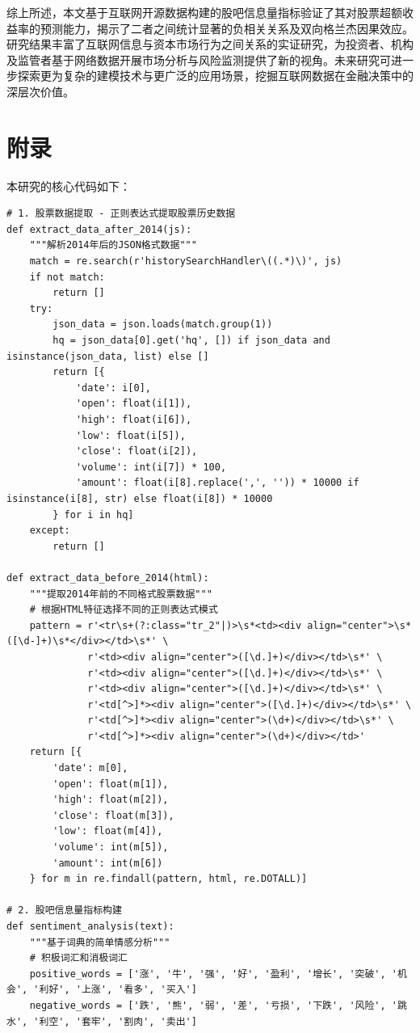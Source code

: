 \documentclass[12pt, a4paper]{article}
\begin{document}
综上所述，本文基于互联网开源数据构建的股吧信息量指标验证了其对股票超额收益率的预测能力，揭示了二者之间统计显著的负相关关系及双向格兰杰因果效应。研究结果丰富了互联网信息与资本市场行为之间关系的实证研究，为投资者、机构及监管者基于网络数据开展市场分析与风险监测提供了新的视角。未来研究可进一步探索更为复杂的建模技术与更广泛的应用场景，挖掘互联网数据在金融决策中的深层次价值。

\printbibliography[title=参考文献]

\section{附录}

本研究的核心代码如下：

\begin{lstlisting}[basicstyle=\small\ttfamily, breaklines=true, columns=fullflexible]
# 1. 股票数据提取 - 正则表达式提取股票历史数据
def extract_data_after_2014(js):
    """解析2014年后的JSON格式数据"""
    match = re.search(r'historySearchHandler\((.*)\)', js)
    if not match:
        return []
    try:
        json_data = json.loads(match.group(1))
        hq = json_data[0].get('hq', []) if json_data and isinstance(json_data, list) else []
        return [{
            'date': i[0],
            'open': float(i[1]),
            'high': float(i[6]),
            'low': float(i[5]),
            'close': float(i[2]),
            'volume': int(i[7]) * 100,
            'amount': float(i[8].replace(',', '')) * 10000 if isinstance(i[8], str) else float(i[8]) * 10000
        } for i in hq]
    except:
        return []

def extract_data_before_2014(html):
    """提取2014年前的不同格式股票数据"""
    # 根据HTML特征选择不同的正则表达式模式
    pattern = r'<tr\s+(?:class="tr_2"|)>\s*<td><div align="center">\s*([\d-]+)\s*</div></td>\s*' \
              r'<td><div align="center">([\d.]+)</div></td>\s*' \
              r'<td><div align="center">([\d.]+)</div></td>\s*' \
              r'<td><div align="center">([\d.]+)</div></td>\s*' \
              r'<td[^>]*><div align="center">([\d.]+)</div></td>\s*' \
              r'<td[^>]*><div align="center">(\d+)</div></td>\s*' \
              r'<td[^>]*><div align="center">(\d+)</div></td>'
    return [{
        'date': m[0],
        'open': float(m[1]),
        'high': float(m[2]),
        'close': float(m[3]),
        'low': float(m[4]),
        'volume': int(m[5]),
        'amount': int(m[6])
    } for m in re.findall(pattern, html, re.DOTALL)]

# 2. 股吧信息量指标构建
def sentiment_analysis(text):
    """基于词典的简单情感分析"""
    # 积极词汇和消极词汇
    positive_words = ['涨', '牛', '强', '好', '盈利', '增长', '突破', '机会', '利好', '上涨', '看多', '买入']
    negative_words = ['跌', '熊', '弱', '差', '亏损', '下跌', '风险', '跳水', '利空', '套牢', '割肉', '卖出']
    

\end{lstlisting}
\end{document}
